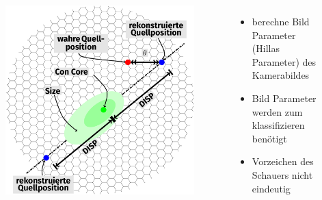 \documentclass[aspectratio=1610, professionalfonts, 9pt]{beamer}
\begin{document}
\begin{frame}
  \begin{columns}[onlytextwidth]
	\begin{figure}
	  \centering
	  \includegraphics[height=0.8\textheight]{./tikz/Camera/Camera.pdf}
	\end{figure}
	\begin{itemize}
	  \item berechne Bild Parameter (Hillas Parameter) des Kamerabildes
	  \item Bild Parameter werden zum klassifizieren benötigt
	  \item Vorzeichen des Schauers nicht eindeutig
	\end{itemize}
  \end{columns}
\end{frame}
\end{document}
